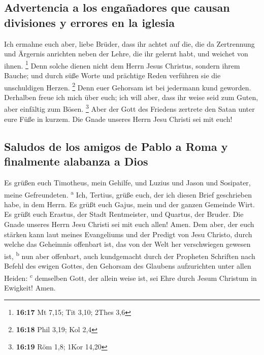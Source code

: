 \hypertarget{advertencia-a-los-engauxf1adores-que-causan-divisiones-y-errores-en-la-iglesia}{%
\subsection{Advertencia a los engañadores que causan divisiones y
errores en la
iglesia}\label{advertencia-a-los-engauxf1adores-que-causan-divisiones-y-errores-en-la-iglesia}}

 Ich ermahne euch aber, liebe Brüder, dass ihr achtet auf
die, die da Zertrennung und Ärgernis anrichten neben der Lehre, die ihr
gelernt habt, und weichet von ihnen. \footnote{\textbf{16:17} Mt 7,15;
  Tit 3,10; 2Thes 3,6}  Denn solche dienen nicht dem
Herrn Jesus Christus, sondern ihrem Bauche; und durch süße Worte und
prächtige Reden verführen sie die unschuldigen Herzen. \footnote{\textbf{16:18}
  Phil 3,19; Kol 2,4}  Denn euer Gehorsam ist bei
jedermann kund geworden. Derhalben freue ich mich über euch; ich will
aber, dass ihr weise seid zum Guten, aber einfältig zum Bösen.
\footnote{\textbf{16:19} Röm 1,8; 1Kor 14,20}  Aber der
Gott des Friedens zertrete den Satan unter eure Füße in kurzem. Die
Gnade unseres Herrn Jesu Christi sei mit euch!

\hypertarget{saludos-de-los-amigos-de-pablo-a-roma-y-finalmente-alabanza-a-dios}{%
\subsection{Saludos de los amigos de Pablo a Roma y finalmente alabanza
a
Dios}\label{saludos-de-los-amigos-de-pablo-a-roma-y-finalmente-alabanza-a-dios}}

 Es grüßen euch Timotheus, mein Gehilfe, und Luzius und
Jason und Sosipater, meine Gefreundeten. \textsuperscript{a}
 Ich, Tertius, grüße euch, der ich diesen Brief
geschrieben habe, in dem Herrn.  Es grüßt euch Gajus,
mein und der ganzen Gemeinde Wirt. Es grüßt euch Erastus, der Stadt
Rentmeister, und Quartus, der Bruder.  Die Gnade unseres
Herrn Jesu Christi sei mit euch allen! Amen.  Dem aber,
der euch stärken kann laut meines Evangeliums und der Predigt von Jesu
Christo, durch welche das Geheimnis offenbart ist, das von der Welt her
verschwiegen gewesen ist, \textsuperscript{b}  nun aber
offenbart, auch kundgemacht durch der Propheten Schriften nach Befehl
des ewigen Gottes, den Gehorsam des Glaubens aufzurichten unter allen
Heiden: \textsuperscript{c}  demselben Gott, der allein
weise ist, sei Ehre durch Jesum Christum in Ewigkeit! Amen.
